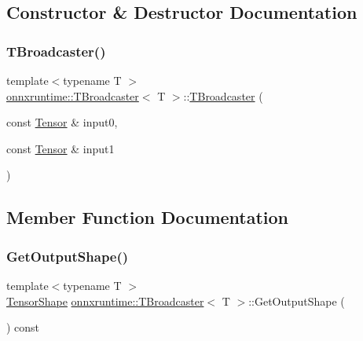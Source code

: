 \subsection{Constructor \& Destructor Documentation}
\mbox{\label{structonnxruntime_1_1TBroadcaster_a766c89ca8afa8556f1499370b5b543d5}} 
\subsubsection{\texorpdfstring{T\+Broadcaster()}{TBroadcaster()}}
{\footnotesize\ttfamily template$<$typename T $>$ \\
\mbox{\hyperlink{structonnxruntime_1_1TBroadcaster}{onnxruntime\+::\+T\+Broadcaster}}$<$ T $>$\+::\mbox{\hyperlink{structonnxruntime_1_1TBroadcaster}{T\+Broadcaster}} (\begin{DoxyParamCaption}\item[{const \mbox{\hyperlink{classonnxruntime_1_1Tensor}{Tensor}} \&}]{input0,  }\item[{const \mbox{\hyperlink{classonnxruntime_1_1Tensor}{Tensor}} \&}]{input1 }\end{DoxyParamCaption})\hspace{0.3cm}{\ttfamily [inline]}}



\subsection{Member Function Documentation}
\mbox{\label{structonnxruntime_1_1TBroadcaster_ab81d65c49997252be8e21a7951c857a4}} 
\subsubsection{\texorpdfstring{Get\+Output\+Shape()}{GetOutputShape()}}
{\footnotesize\ttfamily template$<$typename T $>$ \\
\mbox{\hyperlink{classonnxruntime_1_1TensorShape}{Tensor\+Shape}} \mbox{\hyperlink{structonnxruntime_1_1TBroadcaster}{onnxruntime\+::\+T\+Broadcaster}}$<$ T $>$\+::Get\+Output\+Shape (\begin{DoxyParamCaption}{ }\end{DoxyParamCaption}) const\hspace{0.3cm}{\ttfamily [inline]}}


